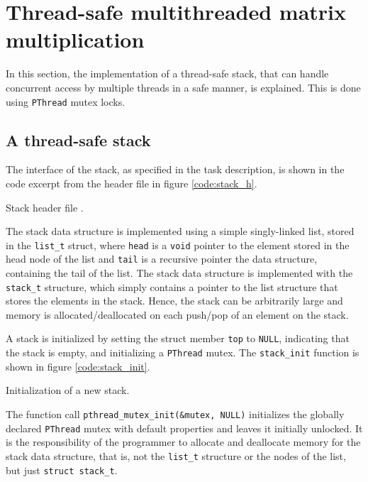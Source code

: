 %
%
%
\section{Thread-safe multithreaded matrix multiplication}
In this section, the implementation of a thread-safe stack, that can handle
concurrent access by multiple threads in a safe manner, is explained. This is
done using \verb|PThread| mutex locks.

\subsection{A thread-safe stack}
The interface of the stack, as specified
in the task description, is shown in the code excerpt from the header file
 in figure \ref{code:stack_h}.

        {Stack header file .}

The stack data structure is implemented using a simple singly-linked list,
stored in the \verb|list_t| struct, where \verb|head| is a \verb|void| pointer
to the element stored in the head node of the list and \verb|tail| is a
recursive pointer the data structure, containing the tail of the list.
The stack data structure is implemented with the \verb|stack_t| structure, which
simply contains a pointer to the list structure that stores the elements in the
stack. Hence, the stack can be arbitrarily large and memory is
allocated/deallocated on each push/pop of an element on the stack.

A stack is initialized by setting the struct member \verb|top| to \verb|NULL|,
indicating that the stack is empty, and initializing a \verb|PThread| mutex.
The \verb|stack_init| function is shown in figure \ref{code:stack_init}.

        {Initialization of a new stack.}

The function call \verb|pthread_mutex_init(&mutex, NULL)| initializes the
globally declared \verb|PThread| mutex with default properties and leaves it
initially unlocked. It is the responsibility of the programmer to allocate
and deallocate memory for the stack data structure, that is, not the
\verb|list_t| structure or the nodes of the list, but just \verb|struct stack_t|.

